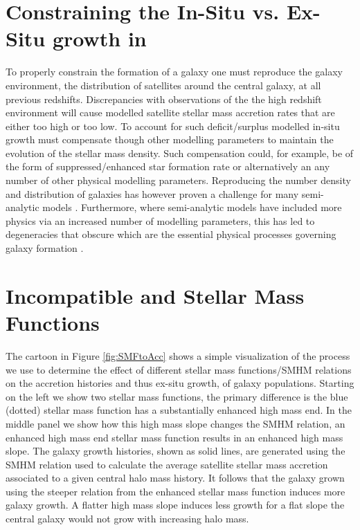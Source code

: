\section{Constraining the In-Situ vs. Ex-Situ growth in \steel}
To properly constrain the formation of a galaxy one must reproduce the galaxy environment, the distribution of satellites around the central galaxy, at all previous redshifts. Discrepancies with observations of the the high redshift environment will cause modelled satellite stellar mass accretion rates that are either too high or too low. To account for such deficit/surplus modelled in-situ growth must compensate though other modelling parameters to maintain the evolution of the stellar mass density. Such compensation could, for example, be of the form of suppressed/enhanced star formation rate or alternatively an any number of other physical modelling parameters. Reproducing the number density and distribution of galaxies has however proven a challenge for many semi-analytic models \citep[e.g.][]{Asquith2018CosmicModels}. Furthermore, where semi-analytic models have included more physics via an increased number of modelling parameters, this has led to degeneracies that obscure which are the essential physical processes governing galaxy formation \citep[e.g.][]{Lapi2011Herschel-atlasGalaxies,Gonzalez2011Evolution4}.


\section{Incompatible \LCDM and Stellar Mass Functions}
The cartoon in Figure \ref{fig:SMFtoAcc} shows a simple visualization of the process we use to determine the effect of different stellar mass functions/SMHM relations on the accretion histories and thus ex-situ growth, of galaxy populations. Starting on the left we show two stellar mass functions, the primary difference is the blue (dotted) stellar mass function has a substantially enhanced high mass end. In the middle panel we show how this high mass slope changes the SMHM relation, an enhanced high mass end stellar mass function results in an enhanced high mass slope. The galaxy growth histories, shown as solid lines, are generated using the SMHM relation used to calculate the average satellite stellar mass accretion associated to a given central halo mass history.
It follows that the galaxy grown using the steeper relation from the enhanced stellar mass function induces more galaxy growth. A flatter high mass slope induces less growth for a flat slope the central galaxy would not grow with increasing halo mass.

